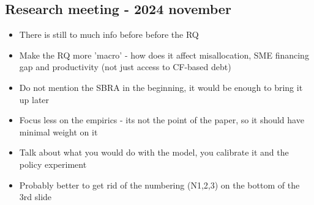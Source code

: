 \documentclass[12pt]{article}
\begin{document}
\subsection*{Research meeting - 2024 november} 
\begin{itemize} \small
    \item There is still to much info before before the RQ
    \item Make the RQ more 'macro' - how does it affect misallocation, SME financing gap and productivity  (not just access to CF-based debt)
    \item Do not mention the SBRA in the beginning, it would be enough to bring it up later
    \item Focus less on the empirics - its not the point of the paper, so it should have minimal weight on it
    \item Talk about what you would do with the model, you calibrate it and the policy experiment
    \item Probably better to get rid of the numbering (N1,2,3) on the bottom of the 3rd slide
\end{itemize}
\end{document}
